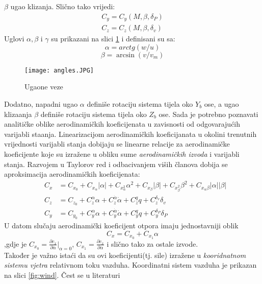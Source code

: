 $\beta$ ugao klizanja. Slično tako vrijedi:
\begin{eqnarray}
    C_y=C_y(M,\beta,\delta_P)\\
    C_z=C_z(M,\beta,\delta_v)
\end{eqnarray}
Uglovi $\alpha, \beta$ i $\gamma$ su prikazani na slici \ref{fig:angles} i definisani su sa:
\begin{equation}
    \alpha=arctg(w/u)
\end{equation}
\begin{equation}
    \beta=\arcsin(v/v_m)
\end{equation}
\begin{figure}[ht!]
    \centering
    \texttt{[image: angles.JPG]}
    \caption{Ugaone veze}
    \label{fig:angles}
\end{figure}
Dodatno, napadni ugao $\alpha$ definiše rotaciju sistema tijela oko $Y_b$ ose, a ugao klizaanja 
$\beta$ definiše rotaciju sistema tijela oko $Z_b$ ose. 
Sada je potrebno poznavati analitičke oblike aerodinamičkih koeficijenata u zavisnosti 
od odgovarajućih varijabli staanja. Linearizacijom aerodinamičkih koeficijanata u okolini trenutnih vrijednosti 
varijabli stanja dobijaju se linearne relacije za aerodinamičke koeficijente koje su 
izražene u obliku sume \textit{aerodinamičkih izvoda} i varijabli stanja.
Razvojem u Taylorov red i odbacivanjem viših članova dobija se aproksimacija 
aerodinamičkih koeficijenata:
\begin{eqnarray}
    &C_x&=C_{x_0}+C_{x_\alpha}|\alpha|+C_{x_\alpha^2}\alpha^2+C_{x_\beta}|\beta|+
    C_{x_\beta^2}\beta^2+C_{x_\alpha \beta}|\alpha||\beta|\\
   &C_z&=C_{z_0}+C_z^{\alpha}{\alpha} + C_z^{\dot{\alpha}} \dot{\alpha}+C_z^q q+C_z^{\delta _v}{\delta _v}\\
    &C_y&=C_{y_0}+C_y^{\alpha}{\alpha} + C_y^{\dot{\alpha}} \dot{\alpha}+C_y^q q+C_y^{\delta _P}{\delta _P}
\end{eqnarray}
U datom slučaju aerodinamički koeficijent otpora imaju jednostavniji oblik
\begin{equation}
    C_x=C_{x_0} + C_{x_1}\alpha
\end{equation}
,gdje je $C_{x_0}=\frac{\partial c_x}{\partial \alpha}|_{\alpha=0}$, $C_{x_1}=\frac{\partial c_x}{\partial \alpha}$ 
i slično tako za ostale izvode.\\
Također je važno istaći da su ovi koeficijenti(tj. sile) izražene u \textit{kooridnatnom sistemu vjetra} 
relativnom toku vazduha. Koordinatni sistem vazduha je prikazan na slici \ref{fig:wind}. Čest se u literaturi 

